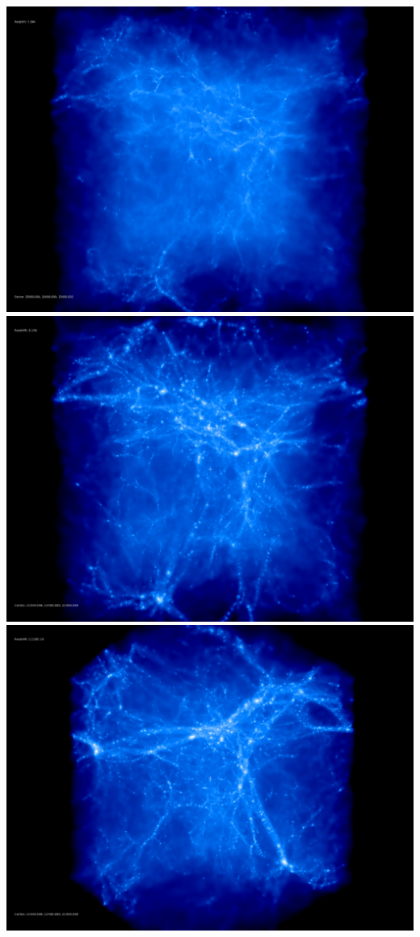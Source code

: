 \includegraphics[scale=0.1]{r256/h70/stages_12_h_44/50.jpg} 
\includegraphics[scale=0.1]{r256/h70/stages_12_h_44/150.jpg} \\
\includegraphics[scale=0.1]{r256/h70/stages_12_h_44/rotate_00074.jpg} \\
